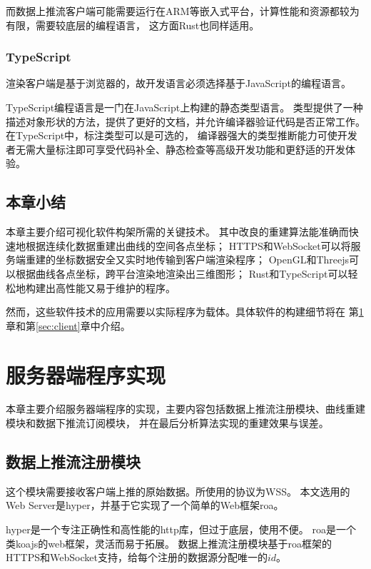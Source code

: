 而数据上推流客户端可能需要运行在ARM等嵌入式平台，计算性能和资源都较为有限，需要较底层的编程语言，
这方面Rust也同样适用。

\subsubsection{TypeScript}
渲染客户端是基于浏览器的，故开发语言必须选择基于JavaScript的编程语言。

TypeScript编程语言\cite{typescript}是一门在JavaScript上构建的静态类型语言。
类型提供了一种描述对象形状的方法，提供了更好的文档，并允许编译器验证代码是否正常工作。
在TypeScript中，标注类型可以是可选的，
编译器强大的类型推断能力可使开发者无需大量标注即可享受代码补全、静态检查等高级开发功能和更舒适的开发体验。

\subsection{本章小结}
本章主要介绍可视化软件构架所需的关键技术。
其中改良的重建算法能准确而快速地根据连续化数据重建出曲线的空间各点坐标；
HTTPS和WebSocket可以将服务端重建的坐标数据安全又实时地传输到客户端渲染程序；
OpenGL和Threejs可以根据曲线各点坐标，跨平台渲染地渲染出三维图形；
Rust和TypeScript可以轻松地构建出高性能又易于维护的程序。

然而，这些软件技术的应用需要以实际程序为载体。具体软件的构建细节将在
第\ref{sec:server}章和第\ref{sec:client}章中介绍。

\clearpage

\section{服务器端程序实现}
\label{sec:server}
本章主要介绍服务器端程序的实现，主要内容包括数据上推流注册模块、曲线重建模块和数据下推流订阅模块，
并在最后分析算法实现的重建效果与误差。
 
\subsection{数据上推流注册模块}
这个模块需要接收客户端上推的原始数据。所使用的协议为WSS。
本文选用的Web Server是hyper\cite{hyper}，并基于它实现了一个简单的Web框架roa\cite{roa}。

hyper是一个专注正确性和高性能的http库，但过于底层，使用不便。
roa是一个类koajs\cite{koajs}的web框架，灵活而易于拓展。
数据上推流注册模块基于roa框架的HTTPS和WebSocket支持，给每个注册的数据源分配唯一的$id$。

